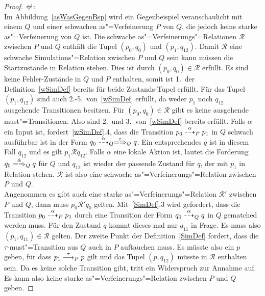 \begin{proof}
  \glqq $\hspace{0.1cm}\not\hspace{-0.1cm}\Leftarrow$\grqq{}:\\
  Im Abbildung~\ref{asWasGegenBsp} wird ein Gegenbeispiel veranschaulicht mit
  einem \MEIO{} $Q$ und einer schwachen as"=Verfeinerung $P$ von $Q$, die
  jedoch keine starke as"=Verfeinerung von $Q$ ist. Die schwache
  as"=Verfeinerungs"=Relationen $\mathcal{R}$ zwischen $P$ und $Q$ enthält die
  Tupel $(p_0,q_0)$ und $(p_1,q_{12})$. Damit $\mathcal{R}$ eine schwache
  Simulations"=Relation zwischen $P$ und $Q$ sein kann müssen die Startzustände
  in Relation stehen. Dies ist durch $(p_0,q_0)\in \mathcal{R}$ erfüllt.
  Es sind keine Fehler-Zustände in $Q$ und $P$ enthalten, somit ist 1.\ der
  Definition~\ref{wSimDef} bereits für beide Zustands-Tupel erfüllt. Für das
  Tupel $(p_1,q_{12})$ sind auch 2.-5.\ von~\ref{wSimDef} erfüllt, da weder
  $p_1$ noch $q_{12}$ ausgehende Transitionen besitzen. Für $(p_0,q_0)\in
  \mathcal{R}$ gibt es keine ausgehende must"=Transitionen. Also sind 2.\ und
  3.\ von~\ref{wSimDef} bereits erfüllt. Falls $\alpha$ ein Input ist,
  fordert~\ref{wSimDef}.4, dass die Transition $p_0 \may[\alpha]_P p_1$ in $Q$
  schwach ausführbar ist in der Form $q_0 \may[\alpha]_Q
  \weakmay[\varepsilon]_Q q$. Ein entsprechendes $q$ ist in diesem Fall
  $q_{12}$ und es gilt $p_1 \mathcal{R} q_{12}$. Falls $\alpha$ eine lokale
  Aktion ist, lautet die Forderung $q_0 \weakmay[\hat{\alpha}]_Q q$ für $Q$ und
  $q_{12}$ ist wieder der passende Zustand für $q$, der mit $p_1$ in Relation
  stehen. $\mathcal{R}$ ist also eine schwache as"=Verfeinerungs"=Relation
  zwischen $P$ und $Q$.\\
  Angenommen es gibt auch eine starke as"=Verfeinerungs"=Relation
  $\mathcal{R}'$ zwischen $P$ und $Q$, dann muss $p_0 \mathcal{R}' q_0$
  gelten. Mit~\ref{SimDef}.3 wird gefordert, dass die Transition $p_0
  \may[\alpha]_P p_1$ durch eine Transition der Form $q_0 \may[\alpha]_Q q$
  in $Q$ gematched werden muss. Für den Zustand $q$ kommt dieses mal nur
  $q_{11}$ in Frage. Es muss also $(p_1,q_{11})\in \mathcal{R}$ gelten. Der
  zweite Punkt der Definition~\ref{SimDef} fordert, dass die
  $\tau$-must"=Transition aus $Q$ auch in $P$ auftauchen muss. Es müsste also
  ein $p$ geben, für dass $p_1 \must[\tau]_P p$ gilt und das Tupel $(p,q_{12})$
  müsste in $\mathcal{R}$ enthalten sein. Da es keine solche Transition gibt,
  tritt ein Widerspruch zur Annahme auf. Es kann also keine starke
  as"=Verfeinerungs"=Relation zwischen $P$ und $Q$ geben.


\end{proof}
